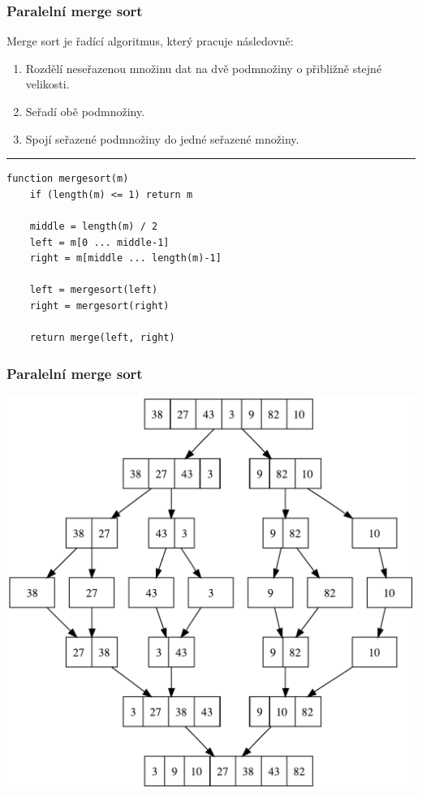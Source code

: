 \documentclass[usenames,dvipsnames,9pt]{beamer}
\begin{document}
\begin{frame}[fragile]
\frametitle{Paralelní merge sort}

Merge sort je řadící algoritmus, který pracuje následovně:

\begin{enumerate}
\item Rozdělí neseřazenou množinu dat na dvě podmnožiny o přibližně stejné velikosti.
\item Seřadí obě podmnožiny.
\item Spojí seřazené podmnožiny do jedné seřazené množiny.
\end{enumerate}

\vspace{1em}\hrule\vspace{1em}

\begin{verbatim}
function mergesort(m)
    if (length(m) <= 1) return m

    middle = length(m) / 2
    left = m[0 ... middle-1]
    right = m[middle ... length(m)-1]

    left = mergesort(left)
    right = mergesort(right)

    return merge(left, right)
\end{verbatim}

  
\end{frame}

\begin{frame}[fragile]
\frametitle{Paralelní merge sort}

\begin{center}
\includegraphics[width=.7\linewidth]{figs/mergesort.pdf}
\end{center}

  
\end{frame}
\end{document}
